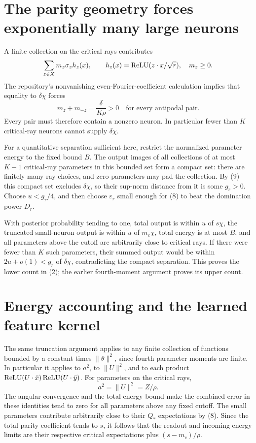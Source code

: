 \documentclass[11pt]{article}
\begin{document}
\section{The parity geometry forces exponentially many large neurons}
A finite collection on the critical rays contributes
\[
 \sum_{z\in X} m_z\sigma_z h_z(x),\qquad
 h_z(x)=\operatorname{ReLU}(z\cdot x/\sqrt r),\quad m_z\ge0.
\]
The repository's nonvanishing even-Fourier-coefficient calculation
implies that equality to $\delta\chi$ forces
\[
 m_z+m_{-z}=\frac{\delta}{K\rho}>0
                          \quad\text{for every antipodal pair}. \tag{9}
\]
Every pair must therefore contain a nonzero neuron. In particular
fewer than $K$ critical-ray neurons cannot supply $\delta\chi$.

For a quantitative separation sufficient here, restrict the normalized
parameter energy to the fixed bound $B$. The output images of all
collections of at most $K-1$ critical-ray parameters in this bounded
set form a compact set: there are finitely many ray choices, and zero
parameters may pad the collection. By (9) this compact set excludes
$\delta\chi$, so their sup-norm distance from it is some $g_r>0$.
Choose $u<g_r/4$, and then choose $\varepsilon_r$ small enough for
(8) to beat the domination power $D_r$.

With posterior probability tending to one, total output is within $u$
of $s\chi$, the truncated small-neuron output is within $u$ of
$m_c\chi$, total energy is at most $B$, and all parameters above
the cutoff are arbitrarily close to critical rays. If there were
fewer than $K$ such parameters, their summed output would be within
$2u+o(1)<g_r$ of $\delta\chi$, contradicting the compact separation.
This proves the lower count in (2); the earlier fourth-moment argument
proves its upper count.

\section{Energy accounting and the learned feature kernel}
The same truncation argument applies to any finite collection of
functions bounded by a constant times $\|\theta\|^2$, since fourth
parameter moments are finite. In particular it applies to $a^2$, to
$\|U\|^2$, and to each product
$\operatorname{ReLU}(U\cdot\bar x)\operatorname{ReLU}(U\cdot\bar y)$.
For parameters on the critical rays,
\[
 a^2=\|U\|^2=Z/\rho.
\]
The angular convergence and the total-energy bound make the combined
error in these identities tend to zero for all parameters above any
fixed cutoff. The small parameters contribute arbitrarily close to
their $Q_*$ expectations by (8). Since the total parity coefficient
tends to $s$, it follows that the readout and incoming energy limits
are their respective critical expectations plus $(s-m_c)/\rho$.
\end{document}
